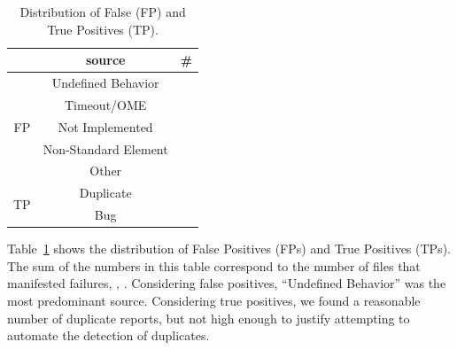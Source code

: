 \documentclass[sigconf,review, anonymous]{acmart}
\begin{document}
\begin{table}
  \vspace{-3ex}
  \small
  \centering
  \caption{\label{fig:falsepositives}\label{fig:truepositives}\label{fig:piecharts-transplantation}Distribution
    of False (FP) and True Positives (TP).}
  \setlength{\tabcolsep}{3pt}      
  \renewcommand*{\arraystretch}{0.9}
  \begin{tabular}{ccr}
    \toprule
    & source &  \#\\
    \midrule
    \multirow{5}{*}{FP} & Undefined Behavior & \noTransUndefined{} \\
    & Timeout/OME & \noTransTimeout{} \\
    & Not Implemented & \noTransNotImplemented{} \\
    & Non-Standard Element & \noTransNonStandard{} \\
    & Other & \noTransOther{} \\
    \midrule
    \multirow{2}{*}{TP} & Duplicate & \noTransTPDuplicated{} \\
    & Bug & \noTransTPBugs{} \\
    \bottomrule
  \end{tabular}
\end{table}


Table~\ref{fig:piecharts-transplantation} shows the distribution of
False Positives (FPs) and True Positives (TPs). The sum of the numbers
in this table correspond to the number of files that manifested
failures, \ie{}, \failuresTestTransDistictFiles{}. Considering false
positives, ``Undefined Behavior'' was the most predominant
source. Considering true positives, we found a reasonable number of
duplicate reports, but not high enough to justify attempting to
automate the detection of duplicates.





\end{document}

